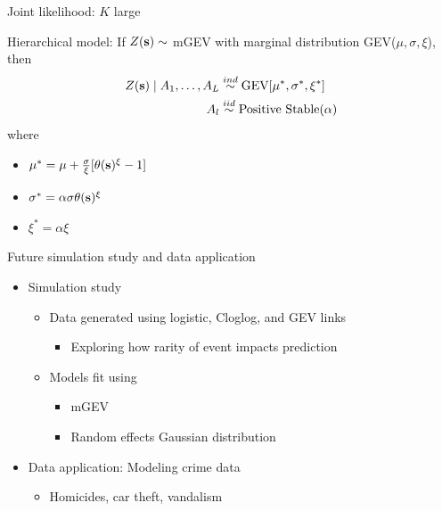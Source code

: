 \documentclass{beamer}
\begin{document}
\begin{frame}{Joint likelihood: $K$ large}
\begin{adjustwidth}{1em}{0em}
  Hierarchical model: If $Z(\mbox{\bf s}) \sim $ mGEV with marginal distribution GEV($\mu, \sigma, \xi$), then
  \begin{align*}
    Z(\mbox{\bf s}) \mid A_1, \ldots, A_L &\stackrel{ind}{\sim} \text{GEV}[\mu^*, \sigma^*, \xi^*] \\
    A_l &\stackrel{iid}{\sim} \text{Positive Stable}(\alpha)
  \end{align*}
  where
  \begin{itemize} \setlength{\itemsep}{0.25em}
    \item $\mu^* = \mu + \frac{ \sigma }{ \xi }[\theta(\mbox{\bf s})^\xi - 1]$
    \item $\sigma^* = \alpha \sigma \theta(\mbox{\bf s})^\xi$
    \item $\xi^* = \alpha \xi$
  \end{itemize}
\end{adjustwidth}
\end{frame}


\begin{frame}{Future simulation study and data application}
  \begin{itemize} \setlength{\itemsep}{1em}
    \item Simulation study \vspace{0.5em}
    \begin{itemize} \setlength{\itemsep}{0.5em}
      \item Data generated using logistic, Cloglog, and GEV links \vspace{0.25em}
      \begin{itemize}
        \item Exploring how rarity of event impacts prediction
      \end{itemize}
      \item Models fit using \vspace{0.25em}
      \begin{itemize} \setlength{\itemsep}{0.25em}
        \item mGEV
        \item Random effects Gaussian distribution
      \end{itemize}
    \end{itemize}
    \item Data application: Modeling crime data \vspace{0.5em}
    \begin{itemize}
      \item Homicides, car theft, vandalism
    \end{itemize}
  \end{itemize}
\end{frame}
\end{document}
